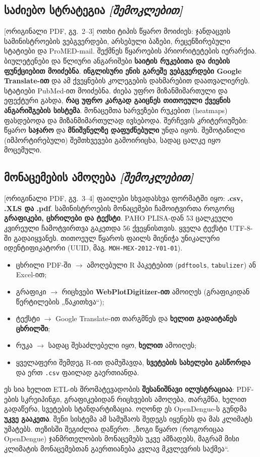 \documentclass[11pt,a4paper]{article}
\newcommand{\imp}[1]{\textbf{\color{importred}#1}}
\newcommand{\pg}[1]{{\small\color{gray}[ორიგინალი PDF, გვ.~#1]}}
\begin{document}
\subsection*{საძიებო სტრატეგია \textit{[შემოკლებით]}} \pg{2--3}
ოთხი ტიპის წყარო მოიძიეს: ჯანდაცვის სამინისტროების ვებგვერდები, არსებული ბაზები, რეცენზირებული სტატიები და ProMED-mail.
შექმნეს წყაროების პრიორიტეტების იერარქია. ბიულეტენები და წლიური ანგარიშები \imp{საიტის რუკებითა და ძიების ფუნქციებით
მოიძებნა}. \imp{ინგლისური ენის გარეშე ვებგვერდები Google Translate-ით} და ამ ქვეყნების კოლეგების დახმარებით დაათვალიერეს.
სტატიები PubMed-ით მოიძებნა. ძიება უფრო მიზანმიმართული და ეფექტური გახდა, \imp{რაც უფრო კარგად გაიცნეს თითოეული ქვეყნის
ანგარიშგების სისტემა}. მონაცემთა ხარვეზები რუკებით (heatmaps) ფასდებოდა და მიზანმიმართულად ივსებოდა.
შერჩევის კრიტერიუმები: წყარო \imp{საჯარო} და \imp{მნიშვნელზე დაფუძნებული} უნდა იყოს. შემოტანილი (იმპორტირებული)
შემთხვევები გამოირიცხა, სადაც ცალკე იყო მოცემული.

\subsection*{მონაცემების ამოღება \textit{[შემოკლებით]}} \pg{3--4}
ფაილები სხვადასხვა ფორმატში იყო: \imp{.csv, .XLS და .pdf}. სამინისტროების მონაცემები ჩამოიტვირთა როგორც \imp{გრაფიკები, ცხრილები და
ტექსტი}. PAHO PLISA-დან 53 ცალკეული კვირეული ჩამოტვირთვა გაკეთდა 56 ქვეყნისთვის. ყველა ტექსტი UTF-8-ში გადაიყვანეს.
თითოეულ წყაროს ფაილს მიენიჭა უნიკალური იდენტიფიკატორი (UUID, მაგ. \texttt{MOH-MEX-2012-Y01-01}).
\begin{itemize}[leftmargin=1.5em]
  \item ცხრილი PDF-ში $\rightarrow$ ამოღებული R პაკეტებით (\texttt{pdftools}, \texttt{tabulizer}) ან Excel-ით;
  \item გრაფიკი $\rightarrow$ რიცხვები \imp{WebPlotDigitizer-ით} ამოიღეს (გრაფიკიდან წერტილების „წაკითხვა“);
  \item ტექსტი $\rightarrow$ Google Translate-ით თარგმნეს და \imp{ხელით გადაიტანეს ცხრილში};
  \item რუკა $\rightarrow$ სადაც შესაძლებელი იყო, \imp{ხელით} ამოიღეს;
  \item ყველაფერი შემდეგ R-ით დამუშავდა, \imp{სვეტების სახელები გასწორდა} და ერთ \texttt{.csv} ფაილად გაერთიანდა.
\end{itemize}

\begin{etl}
ეს სია ხელით ETL-ის შრომატევადობის \imp{შესანიშნავი ილუსტრაციაა}: PDF-ების სკრეიპინგი, გრაფიკებიდან რიცხვების ამოღება, თარგმნა, ხელით
გადაწერა, სვეტების სტანდარტიზაცია. ოღონდ ეს OpenDengue-ს გუნდმა \textbf{უკვე გააკეთა}. შენი სისტემა ამ სამუშაოს
შედეგს იყენებს და მას კლიმატს უმატებს. თეზისში შეგიძლია დაწერო: „ზოგი წყარო (როგორიცაა OpenDengue) ჯანმრთელობის მონაცემებს
უკვე ამზადებს, მაგრამ მისი კლიმატის მონაცემებთან გაერთიანება კვლავ მკვლევრის საქმეა“.
\end{etl}
\end{document}
